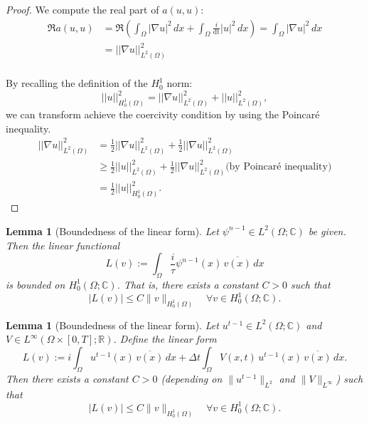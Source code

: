 \documentclass{article}
\theoremstyle{definition}
\theoremstyle{plain}
\newtheorem{lemma}[definition]{Lemma}
\theoremstyle{remark}
\begin{document}
\begin{proof}
We compute the real part of $a(u,u)$:
\begin{align*}
\Re a(u, u)
&= \Re \left( \int_\Omega |\nabla u|^2 \, dx + \int_\Omega  \frac{i}{\text{dt}} |u|^2 \, dx \right) = \int_\Omega |\nabla u|^2 \, dx \\
&= ||\nabla u||_{L^2(\Omega)}^2 \\
\end{align*}

By recalling the definition of the \(H_0^1\) norm:
\[
||u||_{H_0^1(\Omega)}^2 = ||\nabla u||_{L^2(\Omega)}^2 + ||u||_{L^2(\Omega)}^2,
\]
we can transform achieve the coercivity condition by using the Poincaré inequality.
\begin{align*}
  ||\nabla u||_{L^2(\Omega)}^2 &= \frac{1}{2} || \nabla u||_{L^2(\Omega)}^2 + \frac{1}{2} || \nabla u||_{L^2(\Omega)}^2\\
  & \geq \frac{1}{2} ||u||_{L^2(\Omega)}^2 + \frac{1}{2} ||\nabla u||_{L^2(\Omega)}^2 \text{(by Poincaré inequality)} \\
  & = \frac{1}{2} ||u||_{H_0^1(\Omega)}^2.
\end{align*}
\end{proof}

\begin{lemma}[Boundedness of the linear form]
Let $\psi^{n-1} \in L^2(\Omega; \mathbb{C})$ be given. Then the linear functional
\[
L(v) := \int_\Omega \frac{i}{\tau} \psi^{n-1}(x) \, \overline{v(x)} \, dx
\]
is bounded on $H_0^1(\Omega; \mathbb{C})$. That is, there exists a constant $C > 0$ such that
\[
|L(v)| \leq C \|v\|_{H_0^1(\Omega)} \quad \forall v \in H_0^1(\Omega; \mathbb{C}).
\]
\end{lemma}


\begin{lemma}[Boundedness of the linear form]
Let $u^{t-1} \in L^2(\Omega; \mathbb{C})$ and $V \in L^\infty(\Omega \times [0,T]; \mathbb{R})$. Define the linear form
\[
L(v) := i \int_\Omega u^{t-1}(x) \, \overline{v(x)} \, dx + \Delta t \int_\Omega V(x,t) \, u^{t-1}(x) \, \overline{v(x)} \, dx.
\]
Then there exists a constant $C > 0$ (depending on $\|u^{t-1}\|_{L^2}$ and $\|V\|_{L^\infty}$) such that
\[
|L(v)| \leq C \|v\|_{H_0^1(\Omega)} \quad \forall v \in H_0^1(\Omega; \mathbb{C}).
\]
\end{lemma}
\end{document}
